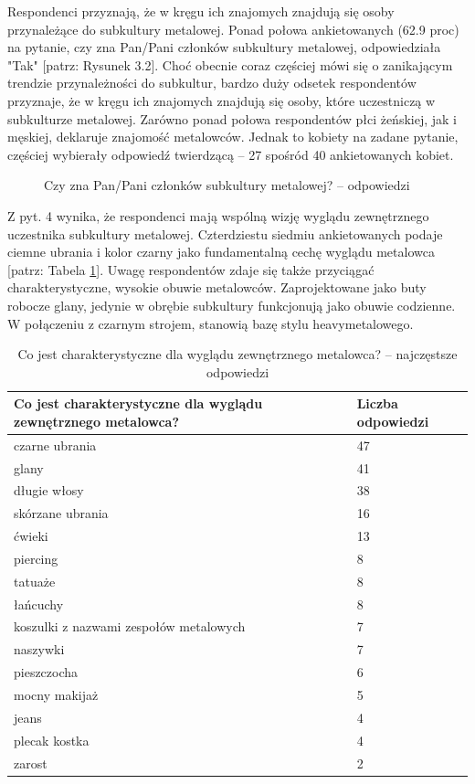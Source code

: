\documentclass[12pt, a4paper, titlepage]{report}
\begin{document}
Respondenci przyznają, że w kręgu ich znajomych znajdują się osoby przynależące do subkultury metalowej. Ponad połowa ankietowanych (62.9 proc) na pytanie, czy zna Pan/Pani członków subkultury metalowej, odpowiedziała "Tak" [patrz: Rysunek 3.2]. Choć obecnie coraz częściej mówi się o zanikającym trendzie przynależności do subkultur, bardzo duży odsetek respondentów przyznaje, że w kręgu ich znajomych znajdują się osoby, które uczestniczą w subkulturze metalowej. Zarówno ponad połowa respondentów płci żeńskiej, jak i męskiej, deklaruje znajomość metalowców. Jednak to kobiety na zadane pytanie, częściej wybierały odpowiedź twierdzącą -- 27 spośród 40 ankietowanych kobiet.

\begin{figure}[!htb]
\centering
{}
\label{Wykres:2}
\caption{Czy zna Pan/Pani członków subkultury metalowej? -- odpowiedzi}
\end{figure}

Z pyt. 4 wynika, że respondenci mają wspólną wizję wyglądu zewnętrznego uczestnika subkultury metalowej. Czterdziestu siedmiu ankietowanych podaje ciemne ubrania i kolor czarny jako fundamentalną cechę wyglądu metalowca [patrz: Tabela \ref{table:2}]. Uwagę respondentów zdaje się także przyciągać charakterystyczne, wysokie obuwie metalowców. Zaprojektowane jako buty robocze glany, jedynie w obrębie subkultury funkcjonują jako obuwie codzienne. W połączeniu z czarnym strojem, stanowią bazę stylu heavymetalowego.


\begin{table}[!htb]
\begin{tabular}{ m{23em} | m{5em} } 
\textbf{Co jest charakterystyczne dla wyglądu zewnętrznego metalowca?} & Liczba odpowiedzi \\
\hline
czarne ubrania & 47 \\
glany & 41 \\
długie włosy & 38 \\
skórzane ubrania & 16 \\
ćwieki & 13 \\
piercing & 8 \\
tatuaże & 8 \\
łańcuchy & 8 \\
koszulki z nazwami zespołów metalowych & 7 \\
naszywki & 7 \\
pieszczocha & 6 \\
mocny makijaż & 5 \\
jeans & 4 \\
plecak kostka & 4 \\
zarost & 2 \\
\end{tabular} 
\caption{Co jest charakterystyczne dla wyglądu zewnętrznego metalowca? -- najczęstsze odpowiedzi}
\label{table:2}
\end{table}
\end{document}
